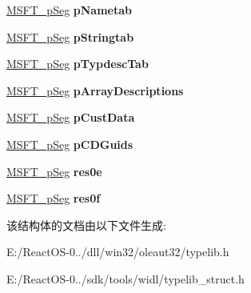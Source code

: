 \begin{DoxyCompactItemize}
\item 
\mbox{\label{structtag_m_s_f_t___seg_dir_a5fcd3a7e6c17bc25a005e3bae7bb766d}} 
\hyperlink{structtag_m_s_f_t__p_seg}{M\+S\+F\+T\+\_\+p\+Seg} {\bfseries p\+Nametab}
\item 
\mbox{\label{structtag_m_s_f_t___seg_dir_afaed0d1ecf2aa3dd2a7dc9ba4a0d411c}} 
\hyperlink{structtag_m_s_f_t__p_seg}{M\+S\+F\+T\+\_\+p\+Seg} {\bfseries p\+Stringtab}
\item 
\mbox{\label{structtag_m_s_f_t___seg_dir_a58975b14ce4da44bca00bc46d982e691}} 
\hyperlink{structtag_m_s_f_t__p_seg}{M\+S\+F\+T\+\_\+p\+Seg} {\bfseries p\+Typdesc\+Tab}
\item 
\mbox{\label{structtag_m_s_f_t___seg_dir_a0144fd530e02db93baf17e597d4640d3}} 
\hyperlink{structtag_m_s_f_t__p_seg}{M\+S\+F\+T\+\_\+p\+Seg} {\bfseries p\+Array\+Descriptions}
\item 
\mbox{\label{structtag_m_s_f_t___seg_dir_aa4a47be66062bde08eb859dbc9f38c5a}} 
\hyperlink{structtag_m_s_f_t__p_seg}{M\+S\+F\+T\+\_\+p\+Seg} {\bfseries p\+Cust\+Data}
\item 
\mbox{\label{structtag_m_s_f_t___seg_dir_a7d490e6874e45078e068a1b733a7436a}} 
\hyperlink{structtag_m_s_f_t__p_seg}{M\+S\+F\+T\+\_\+p\+Seg} {\bfseries p\+C\+D\+Guids}
\item 
\mbox{\label{structtag_m_s_f_t___seg_dir_a98def8c34229ceeb754a48d4a9c1d6c3}} 
\hyperlink{structtag_m_s_f_t__p_seg}{M\+S\+F\+T\+\_\+p\+Seg} {\bfseries res0e}
\item 
\mbox{\label{structtag_m_s_f_t___seg_dir_a548f22938f068353bbc0730b73295c84}} 
\hyperlink{structtag_m_s_f_t__p_seg}{M\+S\+F\+T\+\_\+p\+Seg} {\bfseries res0f}
\end{DoxyCompactItemize}


该结构体的文档由以下文件生成\+:\begin{DoxyCompactItemize}
\item 
E\+:/\+React\+O\+S-\/0../dll/win32/oleaut32/typelib.\+h\item 
E\+:/\+React\+O\+S-\/0../sdk/tools/widl/typelib\+\_\+struct.\+h\end{DoxyCompactItemize}
